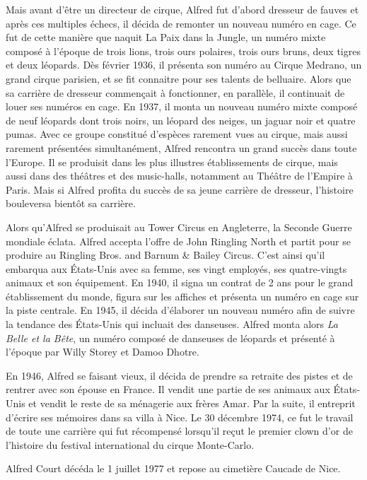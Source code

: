 Mais avant d’être un directeur de cirque, Alfred fut d’abord dresseur de fauves et après ces multiples échecs, il décida de remonter un nouveau numéro en cage. Ce fut de cette manière que naquit La Paix dans la Jungle, un numéro mixte composé à l’époque de trois lions, trois ours polaires, trois ours bruns, deux tigres et deux léopards. Dès février 1936, il présenta son numéro au Cirque Medrano, un grand cirque parisien, et se fit connaitre pour ses talents de belluaire. Alors que sa carrière de dresseur commençait à fonctionner, en parallèle, il continuait de louer ses numéros en cage. En 1937, il monta un nouveau numéro mixte composé de neuf léopards dont trois noirs, un léopard des neiges, un jaguar noir et quatre pumas. Avec ce groupe constitué d’espèces rarement vues au cirque, mais aussi rarement présentées simultanément, Alfred rencontra un grand succès dans toute l’Europe. Il se produisit dans les plus illustres établissements de cirque, mais aussi dans des théâtres et des music-halls, notamment au Théâtre de l’Empire à Paris. Mais si Alfred profita du succès de sa jeune carrière de dresseur, l’histoire bouleversa bientôt sa carrière.

Alors qu’Alfred se produisait au Tower Circus en Angleterre, la Seconde Guerre mondiale éclata. Alfred accepta l'offre de John Ringling North et partit pour se produire au Ringling Bros. and Barnum \& Bailey Circus. C’est ainsi qu’il embarqua aux États-Unis avec sa femme, ses vingt employés, ses quatre-vingts animaux et son équipement. En 1940, il signa un contrat de 2 ans pour le grand établissement du monde, figura sur les affiches et présenta un numéro en cage sur la piste centrale. En 1945, il décida d'élaborer un nouveau numéro afin de suivre la tendance des États-Unis qui incluait des danseuses. Alfred monta alors \textit{La Belle et la Bête}, un numéro composé de danseuses de léopards et présenté à l’époque par Willy Storey et Damoo Dhotre.

En 1946, Alfred se faisant vieux, il décida de prendre sa retraite des pistes et de rentrer avec son épouse en France. Il vendit une partie de ses animaux aux États-Unis et vendit le reste de sa ménagerie aux frères Amar. Par la suite, il entreprit d’écrire ses mémoires dans sa villa à Nice. Le 30 décembre 1974, ce fut le travail de toute une carrière qui fut récompensé lorsqu’il reçut le premier clown d’or de l’histoire du festival international du cirque Monte-Carlo.

Alfred Court décéda le 1 juillet 1977 et repose au cimetière Caucade de Nice.

